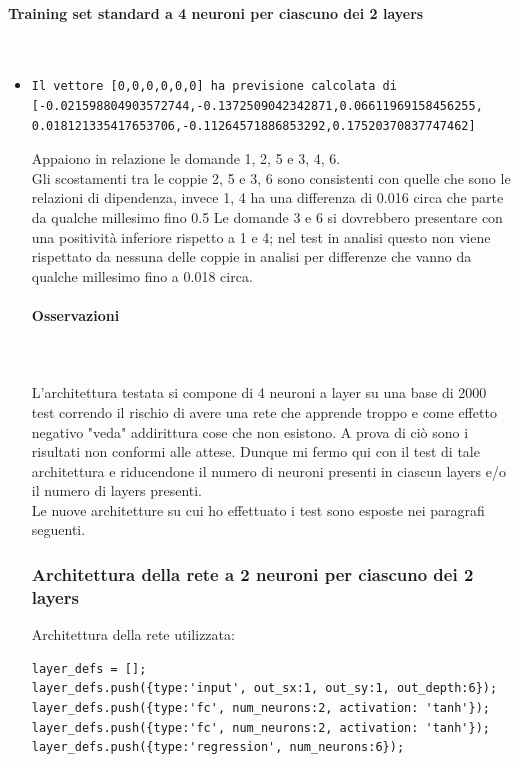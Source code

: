 \paragraph{Training set standard a 4 neuroni per ciascuno dei 2 layers}\mbox{}
\label{Training set standard a 4 neuroni per ciascuno dei 2 layers}
\\
\noindent
\begin{itemize}
\item \begin{verbatim}Il vettore [0,0,0,0,0,0] ha previsione calcolata di
[-0.021598804903572744,-0.1372509042342871,0.06611969158456255,
0.018121335417653706,-0.11264571886853292,0.17520370837747462]\end{verbatim}
Appaiono in relazione le domande 1, 2, 5 e 3, 4, 6.\\
Gli scostamenti tra le coppie 2, 5 e 3, 6 sono consistenti con quelle che sono le relazioni di dipendenza, invece 1, 4 ha una differenza di 0.016 circa che parte da qualche millesimo fino 0.5
Le domande 3 e 6 si dovrebbero presentare con una positivit\`a inferiore rispetto a 1 e 4; nel test in analisi questo non viene rispettato da nessuna delle coppie in analisi per differenze che vanno da qualche millesimo fino a 0.018 circa.
\paragraph{Osservazioni}\mbox{}
\label{Osservazioni su rete a 4 neuroni per ciascuno dei 2 layers}
\\\\
\noindent
L'architettura testata si compone di 4 neuroni a layer su una base di 2000 test correndo il rischio di avere una rete che apprende troppo e come effetto negativo "veda" addirittura cose che non esistono. A prova di ci\`o sono i risultati non conformi alle attese.
Dunque mi fermo qui con il test di tale architettura e riducendone il numero di neuroni presenti in ciascun layers e/o il numero di layers presenti.\\

Le nuove architetture su cui ho effettuato i test sono esposte nei paragrafi seguenti.

\subsubsection{Architettura della rete a 2 neuroni per ciascuno dei 2 layers}
\label{Architettura della rete a 2 neuroni per ciascuno dei 2 layers}
Architettura  della rete utilizzata:\\
\begin{verbatim}layer_defs = [];
layer_defs.push({type:'input', out_sx:1, out_sy:1, out_depth:6});
layer_defs.push({type:'fc', num_neurons:2, activation: 'tanh'});
layer_defs.push({type:'fc', num_neurons:2, activation: 'tanh'});
layer_defs.push({type:'regression', num_neurons:6});


\end{verbatim}
\end{itemize}
